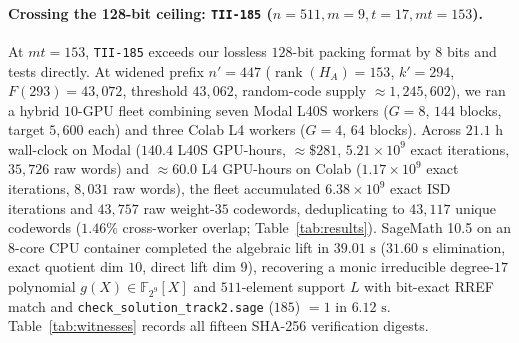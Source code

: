 \documentclass[11pt,a4paper]{article}
\begin{document}
\paragraph{Crossing the 128-bit ceiling: \texttt{TII-185} ($n=511, m=9, t=17, mt=153$).}
At $mt=153$, \texttt{TII-185} exceeds our lossless $128$-bit packing format by $8$ bits and tests  directly. At widened prefix $n'=447$ ($\operatorname{rank}(H_A)=153$, $k'=294$, $F(293)=43{,}072$, threshold $43{,}062$, random-code supply $\approx 1{,}245{,}602$), we ran a hybrid $10$-GPU fleet combining seven Modal L40S workers ($G=8$, $144$ blocks, target $5{,}600$ each) and three Colab L4 workers ($G=4$, $64$ blocks). Across $21.1\text{ h}$ wall-clock on Modal ($140.4$ L40S GPU-hours, $\approx\$281$, $5.21 \times 10^9$ exact iterations, $35{,}726$ raw words) and $\approx 60.0$ L4 GPU-hours on Colab ($1.17 \times 10^9$ exact iterations, $8{,}031$ raw words), the fleet accumulated $6.38 \times 10^9$ exact ISD iterations and $43{,}757$ raw weight-$35$ codewords, deduplicating to $43{,}117$ unique codewords ($1.46\%$ cross-worker overlap; Table~\ref{tab:results}). SageMath 10.5 on an $8$-core CPU container completed the algebraic lift in $39.01\text{ s}$ ($31.60\text{ s}$ elimination, exact quotient dim $10$, direct lift dim $9$), recovering a monic irreducible degree-$17$ polynomial $g(X) \in \mathbb{F}_{2^9}[X]$ and $511$-element support $L$ with bit-exact RREF match and \texttt{check\_solution\_track2.sage} ($185$) $= 1$ in $6.12\text{ s}$. Table~\ref{tab:witnesses} records all fifteen SHA-256 verification digests.
\end{document}
